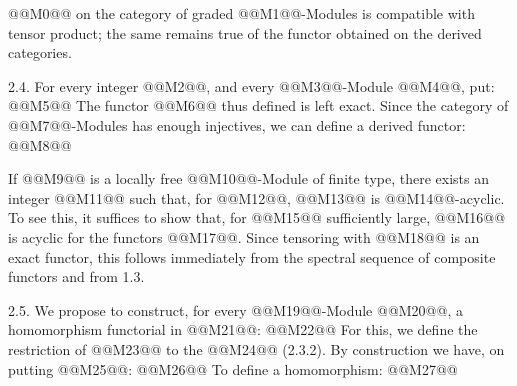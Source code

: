 @@M0@@ on the category of graded @@M1@@-Modules is compatible with tensor product; the same remains true of the functor obtained on the derived categories.

2.4. For every integer @@M2@@, and every @@M3@@-Module @@M4@@, put:
@@M5@@
The functor @@M6@@ thus defined is left exact. Since the category of @@M7@@-Modules has enough injectives, we can define a derived functor:
@@M8@@

If @@M9@@ is a locally free @@M10@@-Module of finite type, there exists an integer @@M11@@ such that, for @@M12@@, @@M13@@ is @@M14@@-acyclic. To see this, it suffices to show that, for @@M15@@ sufficiently large, @@M16@@ is acyclic for the functors @@M17@@. Since tensoring with @@M18@@ is an exact functor, this follows immediately from the spectral sequence of composite functors and from 1.3.

2.5. We propose to construct, for every @@M19@@-Module @@M20@@, a homomorphism functorial in @@M21@@:
@@M22@@
For this, we define the restriction of @@M23@@ to the @@M24@@ (2.3.2). By construction we have, on putting @@M25@@:
@@M26@@
To define a homomorphism:
@@M27@@
